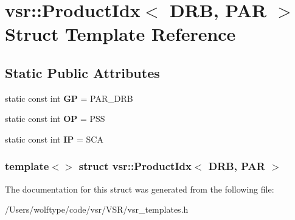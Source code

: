 \hypertarget{structvsr_1_1_product_idx_3_01_d_r_b_00_01_p_a_r_01_4}{\section{vsr\-:\-:Product\-Idx$<$ D\-R\-B, P\-A\-R $>$ Struct Template Reference}
\label{structvsr_1_1_product_idx_3_01_d_r_b_00_01_p_a_r_01_4}
}
\subsection*{Static Public Attributes}
\begin{DoxyCompactItemize}
\item 
\hypertarget{structvsr_1_1_product_idx_3_01_d_r_b_00_01_p_a_r_01_4_aec1407a7bade83c114f8599737c0c1a1}{static const int {\bfseries G\-P} = P\-A\-R\-\_\-\-D\-R\-B}\label{structvsr_1_1_product_idx_3_01_d_r_b_00_01_p_a_r_01_4_aec1407a7bade83c114f8599737c0c1a1}

\item 
\hypertarget{structvsr_1_1_product_idx_3_01_d_r_b_00_01_p_a_r_01_4_a6f7ab2adc6f18bc7fc97573823e40966}{static const int {\bfseries O\-P} = P\-S\-S}\label{structvsr_1_1_product_idx_3_01_d_r_b_00_01_p_a_r_01_4_a6f7ab2adc6f18bc7fc97573823e40966}

\item 
\hypertarget{structvsr_1_1_product_idx_3_01_d_r_b_00_01_p_a_r_01_4_a1334c1977a7066334f9b6c59f8158dd5}{static const int {\bfseries I\-P} = S\-C\-A}\label{structvsr_1_1_product_idx_3_01_d_r_b_00_01_p_a_r_01_4_a1334c1977a7066334f9b6c59f8158dd5}

\end{DoxyCompactItemize}
\subsubsection*{template$<$$>$ struct vsr\-::\-Product\-Idx$<$ D\-R\-B, P\-A\-R $>$}



The documentation for this struct was generated from the following file\-:\begin{DoxyCompactItemize}
\item 
/\-Users/wolftype/code/vsr/\-V\-S\-R/vsr\-\_\-templates.\-h\end{DoxyCompactItemize}

